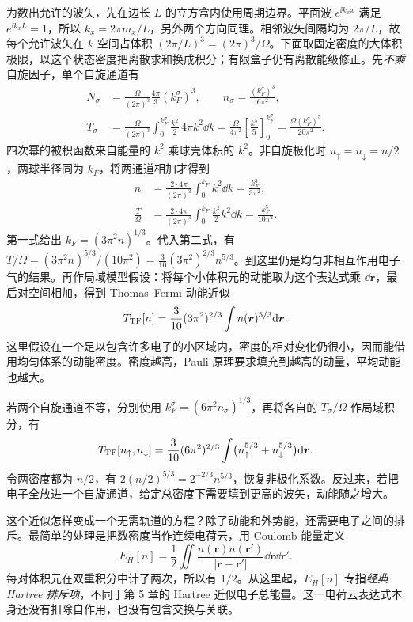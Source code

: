 为数出允许的波矢，先在边长 $L$ 的立方盒内使用周期边界。平面波 $e^{\ii k_xx}$ 满足 $e^{\ii k_xL}=1$，所以 $k_x=2\pi m_x/L$，另外两个方向同理。相邻波矢间隔均为 $2\pi/L$，故每个允许波矢在 $k$ 空间占体积 $(2\pi/L)^3=(2\pi)^3/\Omega$。下面取固定密度的大体积极限，以这个状态密度把离散求和换成积分；有限盒子仍有离散能级修正。先\emph{不乘}自旋因子，单个自旋通道有
\begin{align}
N_\sigma&=\frac{\Omega}{(2\pi)^3}\frac{4\pi}{3}(k_F^\sigma)^3,
\qquad n_\sigma=\frac{(k_F^\sigma)^3}{6\pi^2},\\
T_\sigma&=\frac{\Omega}{(2\pi)^3}\int_0^{k_F^\sigma}\frac{k^2}{2}\,4\pi k^2\dd k
=\frac{\Omega}{4\pi^2}\left[\frac{k^5}{5}\right]_0^{k_F^\sigma}
=\frac{\Omega(k_F^\sigma)^5}{20\pi^2}.
\end{align}
四次幂的被积函数来自能量的 $k^2$ 乘球壳体积的 $k^2$。非自旋极化时 $n_\uparrow=n_\downarrow=n/2$，两球半径同为 $k_F$，将两通道相加才得到
\begin{align}
n&=\frac{2\cdot4\pi}{(2\pi)^3}\int_0^{k_F}k^2\dd k
=\frac{k_F^3}{3\pi^2},\\
\frac{T}{\Omega}&=\frac{2\cdot4\pi}{(2\pi)^3}\int_0^{k_F}\frac{k^2}{2}k^2\dd k
=\frac{k_F^5}{10\pi^2}.
\end{align}
第一式给出 $k_F=(3\pi^2 n)^{1/3}$。代入第二式，有 $T/\Omega=(3\pi^2n)^{5/3}/(10\pi^2)=\tfrac3{10}(3\pi^2)^{2/3}n^{5/3}$。到这里仍是均匀非相互作用电子气的结果。再作局域模型假设：将每个小体积元的动能取为这个表达式乘 $\dd\bm r$，最后对空间相加，得到 Thomas--Fermi 动能近似
\begin{equation}
T_{\rm TF}[n]=\frac3{10}(3\pi^2)^{2/3}\int n(\bm r)^{5/3}\mathrm{d}\bm r.
\end{equation}
这里假设在一个足以包含许多电子的小区域内，密度的相对变化仍很小，因而能借用均匀体系的动能密度。密度越高，Pauli 原理要求填充到越高的动量，平均动能也越大。

若两个自旋通道不等，分别使用
$k_F^\sigma=(6\pi^2n_\sigma)^{1/3}$，再将各自的 $T_\sigma/\Omega$ 作局域积分，有
\begin{equation}
T_{\rm TF}[n_\uparrow,n_\downarrow]
=\frac3{10}(6\pi^2)^{2/3}\int
\bigl(n_\uparrow^{5/3}+n_\downarrow^{5/3}\bigr)\mathrm{d}\bm r.
\end{equation}
令两密度都为 $n/2$，有 $2(n/2)^{5/3}=2^{-2/3}n^{5/3}$，恢复非极化系数。反过来，若把电子全放进一个自旋通道，给定总密度下需要填到更高的波矢，动能随之增大。

这个近似怎样变成一个无需轨道的方程？除了动能和外势能，还需要电子之间的排斥。最简单的处理是把数密度当作连续电荷云，用 Coulomb 能量定义
\begin{equation}\label{dft:hartree-energy}
E_H[n]=\frac12\iint\frac{n(\bm r)n(\bm r')}{|\bm r-\bm r'|}\dd\bm r\dd\bm r'.
\end{equation}
每对体积元在双重积分中计了两次，所以有 $1/2$。从这里起，$E_H[n]$ 专指\emph{经典 Hartree 排斥项}，不同于第 5 章的 Hartree 近似电子总能量。这一电荷云表达式本身还没有扣除自作用，也没有包含交换与关联。

